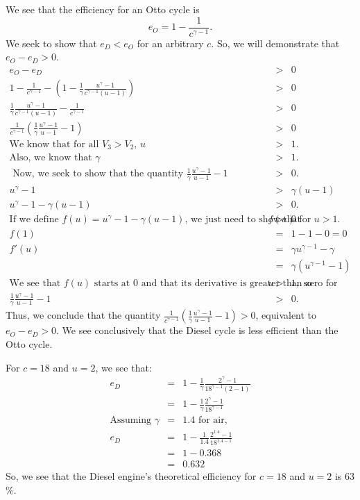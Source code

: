 \documentclass[12pt]{article}
\begin{document}
\begin{enumerate}
	We see that the efficiency for an Otto cycle is $$e_O = 1 - \frac{1}{c^{\gamma-1}}.$$
	We seek to show that $e_D < e_O$ for an arbitrary $c$. So, we will demonstrate that $e_O - e_D > 0$.
	\begin{eqnarray*}
		e_O - e_D &>& 0 \\
		1 - \frac{1}{c^{\gamma-1}} - \left( 1 - \frac{1}{\gamma} \frac{u^\gamma - 1}{c^{\gamma-1}(u - 1)} \right) &>& 0 \\
		\frac{1}{\gamma} \frac{u^\gamma - 1}{c^{\gamma-1}(u - 1)} - \frac{1}{c^{\gamma-1}} &>& 0 \\
		\frac{1}{c^{\gamma-1}} \left( \frac{1}{\gamma} \frac{u^\gamma - 1}{u - 1} - 1 \right) &>& 0 \\
		\mbox{We know that for all $V_3 > V_2$, } u &>& 1. \\
		\mbox{Also, we know that } \gamma &>& 1. \\
		\mbox{ Now, we seek to show that the quantity $\frac{1}{\gamma} \frac{u^\gamma - 1}{u - 1} - 1$} &>& 0. \\
		u^{\gamma} - 1 &>& \gamma (u-1) \\
		u^{\gamma} - 1 - \gamma (u-1) &>& 0. \\
		\mbox{If we define $f(u) = u^{\gamma} - 1 - \gamma (u-1)$, we just need to show that } f(u) &>& 0 \mbox{ for $u > 1$.} \\
		f(1) &=& 1 - 1 - 0 = 0 \\
		f'(u) &=& \gamma u^{\gamma - 1} - \gamma \\
		&=& \gamma \left( u^{\gamma - 1} - 1 \right) \\
		\mbox{We see that $f(u)$ starts at $0$ and that its derivative is greater than zero for } u &>& 1, \mbox{ so} \\
		\frac{1}{\gamma} \frac{u^\gamma - 1}{u - 1} - 1 &>& 0.
	\end{eqnarray*}
	Thus, we conclude that the quantity $\frac{1}{c^{\gamma-1}} \left( \frac{1}{\gamma} \frac{u^\gamma - 1}{u - 1} - 1 \right) > 0$, equivalent to $e_O - e_D > 0$. We see conclusively that the Diesel cycle is less efficient than the Otto cycle.

	For $c = 18$ and $u = 2$, we see that:
	\begin{eqnarray*}
		e_D &=& 1 - \frac{1}{\gamma} \frac{2^\gamma - 1}{18^{\gamma-1}(2 - 1)} \\
		&=& 1 - \frac{1}{\gamma} \frac{2^\gamma - 1}{18^{\gamma-1}} \\
		\mbox{Assuming } \gamma &=& 1.4 \mbox{ for air,} \\
		e_D &=& 1 - \frac{1}{1.4} \frac{2^{1.4} - 1}{18^{1.4-1}} \\
		&=& 1 - 0.368\\
		&=& 0.632
	\end{eqnarray*}
	So, we see that the Diesel engine's theoretical efficiency for $c = 18$ and $u = 2$ is 63$\%$.
\end{enumerate}
\end{document}
